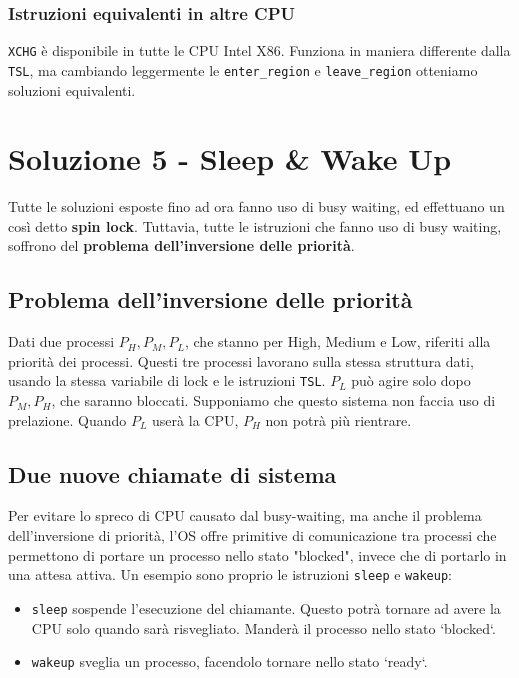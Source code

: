 \documentclass{report}
\begin{document}
\subsubsection{Istruzioni equivalenti in altre CPU}
\verb|XCHG| è disponibile in tutte le CPU Intel X86. Funziona in maniera differente dalla \verb|TSL|, ma cambiando leggermente le \verb*|enter_region| e \verb*|leave_region| otteniamo soluzioni equivalenti.


\section{Soluzione 5 - Sleep \& Wake Up}
Tutte le soluzioni esposte fino ad ora fanno uso di busy waiting, ed effettuano un così detto \textbf{spin lock}. Tuttavia, tutte le istruzioni che fanno uso di busy waiting, soffrono del \textbf{problema dell'inversione delle priorità}.

\subsection{Problema dell'inversione delle priorità}
Dati due processi $P_H, P_M, P_L$, che stanno per High, Medium e Low, riferiti alla priorità dei processi. Questi tre processi lavorano sulla stessa struttura dati, usando la stessa variabile di lock e le istruzioni \verb|TSL|.
$P_L$ può agire solo dopo $P_M, P_H$, che saranno bloccati. Supponiamo che questo sistema non faccia uso di prelazione. Quando $P_L$ userà la CPU, $P_H$ non potrà più rientrare.

\subsection{Due nuove chiamate di sistema}


Per evitare lo spreco di CPU causato dal busy-waiting, ma anche il problema dell'inversione di priorità, l'OS offre primitive di comunicazione tra processi che permettono di portare un processo nello stato "blocked", invece che di portarlo in una attesa attiva. 
Un esempio sono proprio le istruzioni \verb|sleep| e \verb|wakeup|:
\begin{itemize}
  \item \verb*|sleep| sospende l'esecuzione del chiamante. Questo potrà tornare ad avere la CPU solo quando sarà risvegliato. Manderà il processo nello stato `blocked`.
  \item \verb*|wakeup| sveglia un processo, facendolo tornare nello stato `ready`.
\end{itemize}
\end{document}
